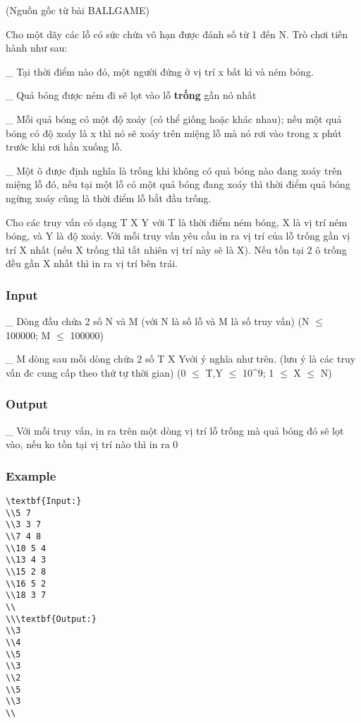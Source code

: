 



   (Nguồn gốc từ bài BALLGAME)  

   Cho một dãy các lỗ có sức chứa vô hạn được đánh số từ 1 đến N. Trò chơi tiến hành như sau:  

   \_ Tại thời điểm nào đó, một người đứng ở vị trí x bất kì và ném bóng.  

   \_ Quả bóng được ném đi sẽ lọt vào lỗ   \textbf{    trống   }   gần nó nhất  

   \_ Mỗi quả bóng có một độ xoáy (có thể giống hoặc khác nhau); nếu một quả bóng có độ xoáy là x thì nó sẽ xoáy trên miệng lỗ mà nó rơi vào trong x phút trước khi rơi hẳn xuống lỗ.  

   \_ Một ô được định nghĩa là trống khi không có quả bóng nào đang xoáy trên miệng lỗ đó, nếu tại một lỗ có một quả bóng đang xoáy thì thời điểm quả bóng ngừng xoáy cũng là thời điểm lỗ bắt đầu trống.  

   Cho các truy vấn có dạng T X Y với T là thời điểm ném bóng, X là vị trí ném bóng, và Y là độ xoáy. Với mỗi truy vấn yêu cầu in ra vị trí của lỗ trống gần vị trí X nhất (nếu X trống thì tất nhiên vị trí này sẽ là X). Nếu tồn tại 2 ô trống đều gần X nhất thì in ra vị trí bên trái.  

\subsubsection{   Input  }

   \_ Dòng đầu chứa 2 số N và M (với N là số lỗ và M là số truy vấn) (N $\le$ 100000; M $\le$ 100000)  

   \_ M dòng sau mỗi dòng chứa 2 số T X Yvới ý nghĩa như trên. (lưu ý là các truy vấn đc cung cấp theo thứ tự thời gian) (0 $\le$ T,Y $\le$ 10\textasciicircum9; 1 $\le$ X $\le$ N)  

\subsubsection{   Output  }

   \_ Với mỗi truy vấn, in ra trên một dòng vị trí lỗ trống mà quả bóng đó sẽ lọt vào, nếu ko tồn tại vị trí nào thì in ra 0  

\subsubsection{   Example  }
\begin{verbatim}
\textbf{Input:}
\\5 7
\\3 3 7
\\7 4 8
\\10 5 4
\\13 4 3
\\15 2 8
\\16 5 2
\\18 3 7
\\
\\\textbf{Output:}
\\3
\\4
\\5
\\3
\\2
\\5
\\3
\\\end{verbatim}
